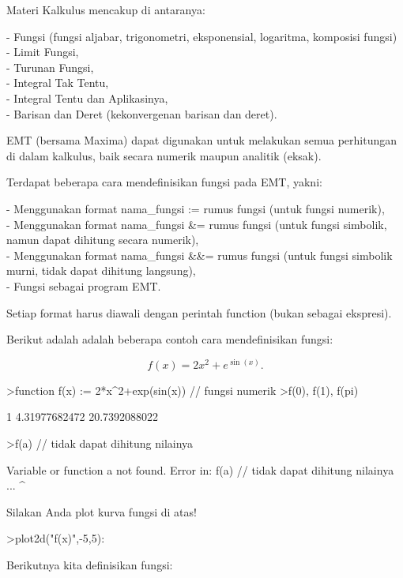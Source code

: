 \documentclass{article}
\begin{document}
\begin{eulernotebook}
\begin{eulercomment}
Materi Kalkulus mencakup di antaranya:

- Fungsi (fungsi aljabar, trigonometri, eksponensial, logaritma,
komposisi fungsi)\\
- Limit Fungsi,\\
- Turunan Fungsi,\\
- Integral Tak Tentu,\\
- Integral Tentu dan Aplikasinya,\\
- Barisan dan Deret (kekonvergenan barisan dan deret).

EMT (bersama Maxima) dapat digunakan untuk melakukan semua perhitungan
di dalam kalkulus, baik secara numerik maupun analitik (eksak).

\end{eulercomment}
\begin{eulercomment}
Terdapat beberapa cara mendefinisikan fungsi pada EMT, yakni:

- Menggunakan format nama\_fungsi := rumus fungsi (untuk fungsi
numerik),\\
- Menggunakan format nama\_fungsi \&= rumus fungsi (untuk fungsi
simbolik, namun dapat dihitung secara numerik),\\
- Menggunakan format nama\_fungsi \&\&= rumus fungsi (untuk fungsi
simbolik murni, tidak dapat dihitung langsung),\\
- Fungsi sebagai program EMT.

Setiap format harus diawali dengan perintah function (bukan sebagai
ekspresi).

Berikut adalah adalah beberapa contoh cara mendefinisikan fungsi:

\end{eulercomment}
\begin{eulerformula}
\[
f(x)=2x^2+e^{\sin(x)}.
\]
\end{eulerformula}
\begin{eulerprompt}
>function f(x) := 2*x^2+exp(sin(x)) // fungsi numerik
>f(0), f(1), f(pi)
\end{eulerprompt}
\begin{euleroutput}
  1
  4.31977682472
  20.7392088022
\end{euleroutput}
\begin{eulerprompt}
>f(a) // tidak dapat dihitung nilainya
\end{eulerprompt}
\begin{euleroutput}
  Variable or function a not found.
  Error in:
  f(a) // tidak dapat dihitung nilainya ...
     ^
\end{euleroutput}
\begin{eulercomment}
Silakan Anda plot kurva fungsi di atas!
\end{eulercomment}
\begin{eulerprompt}
>plot2d("f(x)",-5,5):
\end{eulerprompt}
\begin{eulercomment}
Berikutnya kita definisikan fungsi:


\end{eulercomment}
\end{eulernotebook}
\end{document}

